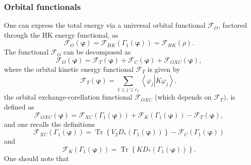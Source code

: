 \documentclass[aps,preprint]{revtex4}%
\begin{document}
\subsubsection{Orbital functionals\label{GSOFunc}}

One can express the total energy via a universal orbital functional
$\mathcal{F}_{O}$, factored through the HK energy functional, as
\begin{equation}
\mathcal{F}_{O}\left(  \boldsymbol{\varphi}\right)  =\mathcal{F}_{HK}\left(
\Gamma_{1}\left(  \boldsymbol{\varphi}\right)  \right)  =\mathcal{F}%
_{HK}\left(  \rho\right)  . \label{FO}%
\end{equation}
The functional $\mathcal{F}_{O}$ can be decomposed as
\begin{equation}
\mathcal{F}_{O}\left(  \boldsymbol{\varphi}\right)  =\mathcal{F}_{T}\left(
\boldsymbol{\varphi}\right)  +\mathcal{F}_{C}\left(  \boldsymbol{\varphi
}\right)  +\mathcal{F}_{OXC}\left(  \boldsymbol{\varphi}\right)  , \label{KS1}%
\end{equation}
where the orbital kinetic energy functional $\mathcal{F}_{T}$ is given by
\begin{equation}
\mathcal{F}_{T}\left(  \boldsymbol{\varphi}\right)  =\sum_{1\leq j\leq r_{1}%
}\left\langle \varphi_{j}\left\vert K\varphi_{j}\right.  \right\rangle ,
\end{equation}
the orbital exchange-corellation functional $\mathcal{F}_{OXC}$ (which depends
on $\mathcal{F}_{T}\boldsymbol{)}$, is defined as
\begin{equation}
\mathcal{F}_{OXC}\left(  \boldsymbol{\varphi}\right)  =\mathcal{F}_{XC}\left(
\Gamma_{1}\left(  \boldsymbol{\varphi}\right)  \right)  +\mathcal{F}%
_{K}\left(  \Gamma_{1}\left(  \boldsymbol{\varphi}\right)  \right)
-\mathcal{F}_{T}\left(  \boldsymbol{\varphi}\right)  , \label{KS2}%
\end{equation}
and one recalls the definitions
\begin{equation}
\mathcal{F}_{XC}\left(  \Gamma_{1}\left(  \boldsymbol{\varphi}\right)
\right)  =\operatorname{Tr}\left\{  V_{2}D_{\ast}\left(  \Gamma_{1}\left(
\boldsymbol{\varphi}\right)  \right)  \right\}  -\mathcal{F}_{C}\left(
\Gamma_{1}\left(  \boldsymbol{\varphi}\right)  \right)  \label{KS3}%
\end{equation}
and
\begin{equation}
\mathcal{F}_{K}\left(  \Gamma_{1}\left(  \boldsymbol{\varphi}\right)  \right)
=\operatorname{Tr}\left\{  KD_{\ast}\left(  \Gamma_{1}\left(
\boldsymbol{\varphi}\right)  \right)  \right\}  . \label{KS4}%
\end{equation}
One should note that
\end{document}
